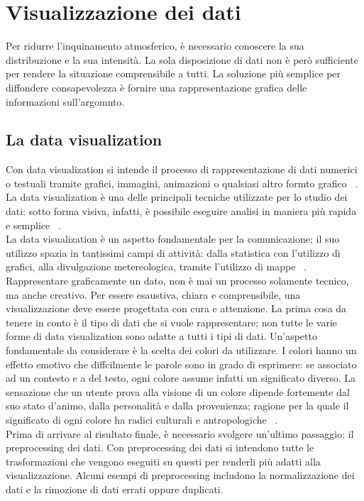 \section{Visualizzazione dei dati}
Per ridurre l'inquinamento atmosferico, è necessario conoscere la sua distribuzione e la sua intensità.
La sola disposizione di dati non è però sufficiente per rendere la situazione comprensibile a tutti.
La soluzione più semplice per diffondere consapevolezza è fornire una rappresentazione grafica delle informazioni sull'argomnto.
\subsection{La data visualization}
Con data visualization si intende il processo di rappresentazione di dati numerici o testuali tramite grafici, immagini, animazioni o qualsiasi altro formto grafico ~\cite{data_visualization}.
La data visualization è una delle principali tecniche utilizzate per lo studio dei dati: sotto forma visiva, infatti, è possibile eseguire analisi in maniera più rapida e semplice ~\cite{data_visualization}.
\\
La data visualization è un aspetto fondamentale per la comunicazione; il suo utilizzo spazia in tantissimi campi di attività:
dalla statistica con l'utilizzo di grafici, alla divulgazione metereologica, tramite l'utilizzo di mappe ~\cite{data_visualization}.
Rappresentare graficamente un dato, non è mai un processo solamente tecnico, ma anche creativo.
Per essere esaustiva, chiara e comprensibile, una visualizzazione deve essere progettata con cura e attenzione. La prima cosa da tenere in conto è il tipo di dati che si vuole rappresentare; non tutte le varie forme di data visualization sono adatte a tutti i tipi di dati.
Un'aspetto fondamentale da considerare è la scelta dei colori da utilizzare.
I colori hanno un effetto emotivo che diffcilmente le parole sono in grado di esprimere: se associato ad un contesto e a del testo, ogni colore assume infatti un significato diverso.
La sensazione che un utente prova alla visione di un colore dipende fortemente dal suo stato d'animo, dalla personalità e dalla provenienza; ragione per la quale il significato di ogni colore ha radici culturali e antropologiche ~\cite{color_symbolism}.
\\
Prima di arrivare al risultato finale, è necessario svolgere un'ultimo passaggio: il preprocessing dei dati.
Con preprocessing dei dati si intendono tutte le trasformazioni che vengono eseguiti su questi per renderli più adatti alla visualizzazione.
Alcuni esempi di preprocessing includono  la normalizzazione dei dati e la rimozione di dati errati oppure duplicati.


